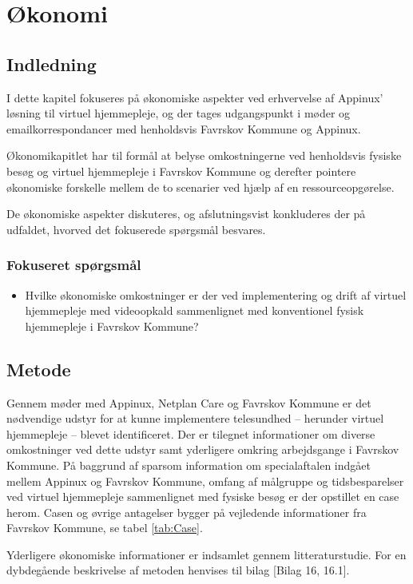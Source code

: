 \chapter{Økonomi}
\section{Indledning}
I dette kapitel fokuseres på økonomiske aspekter ved erhvervelse af Appinux’ løsning til virtuel hjemmepleje, og der tages udgangspunkt i møder og emailkorrespondancer med henholdsvis Favrskov Kommune og Appinux. 

Økonomikapitlet har til formål at belyse omkostningerne ved henholdsvis fysiske besøg og virtuel hjemmepleje i Favrskov Kommune og derefter pointere økonomiske forskelle mellem de to scenarier ved hjælp af en ressourceopgørelse.

De økonomiske aspekter diskuteres, og afslutningsvist konkluderes der på udfaldet, hvorved det fokuserede spørgsmål besvares. 

\subsection{Fokuseret spørgsmål}
\begin{itemize}
	\item Hvilke økonomiske omkostninger er der ved implementering og drift af virtuel hjemmepleje med videoopkald sammenlignet med konventionel fysisk hjemmepleje i Favrskov Kommune?
\end{itemize}

\section{Metode}
Gennem møder med Appinux, Netplan Care og Favrskov Kommune er det nødvendige udstyr for at kunne implementere telesundhed – herunder virtuel hjemmepleje – blevet identificeret. 
Der er tilegnet informationer om diverse omkostninger ved dette udstyr samt yderligere omkring arbejdsgange i Favrskov Kommune.
På baggrund af sparsom information om specialaftalen indgået mellem Appinux og Favrskov Kommune, omfang af målgruppe og tidsbesparelser ved virtuel hjemmepleje sammenlignet med fysiske besøg er der opstillet en case herom. Casen og øvrige antagelser bygger på vejledende informationer fra Favrskov Kommune, se tabel \ref{tab:Case}.

Yderligere økonomiske informationer er indsamlet gennem litteraturstudie. For en dybdegående beskrivelse af metoden henvises til bilag [Bilag 16, 16.1]. 

